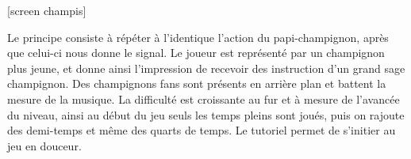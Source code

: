 [screen champis]

Le principe consiste à répéter à l'identique l'action du papi-champignon, après que celui-ci nous donne le signal. Le joueur est représenté par un champignon plus jeune, et donne ainsi l'impression de recevoir des instruction d'un grand sage champignon. Des champignons fans sont présents en arrière plan et battent la mesure de la musique. La difficulté est croissante au fur et à mesure de l'avancée du niveau, ainsi au début du jeu seuls les temps pleins sont joués, puis on rajoute des demi-temps et même des quarts de temps. Le tutoriel permet de s'initier au jeu en douceur.